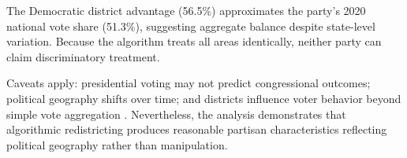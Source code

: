 The Democratic district advantage (56.5\%) approximates the party's 2020 national vote share (51.3\%), suggesting aggregate balance despite state-level variation. Because the algorithm treats all areas identically, neither party can claim discriminatory treatment.

Caveats apply: presidential voting may not predict congressional outcomes; political geography shifts over time; and districts influence voter behavior beyond simple vote aggregation \cite{pegden2017computational}. Nevertheless, the analysis demonstrates that algorithmic redistricting produces reasonable partisan characteristics reflecting political geography rather than manipulation.
